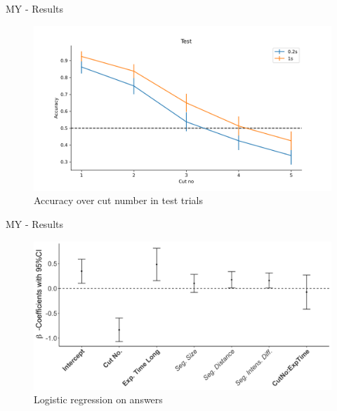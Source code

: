 \documentclass[10pt,xcolor=svgnames]{beamer} %
\begin{document}
\begin{frame}{MY - Results}
    \begin{figure}
        \hspace*{-1cm} 
        \centering
        \includegraphics[width = 1.2\textwidth]{pictures/my_test.png}
        \caption{Accuracy over cut number in test trials}
        \label{fig:my_test}
    \end{figure}    
\end{frame}

\begin{frame}{MY - Results}
    \begin{figure}
        \hspace*{-1cm} 
        \centering
        \includegraphics[width = 1.1\textwidth]{pictures/my_test_coefficients_othrs_tgthr.png}
        \caption{Logistic regression on answers}
        \label{fig:my_test_coeffs_othrs}
    \end{figure}    
\end{frame}

\end{document}

